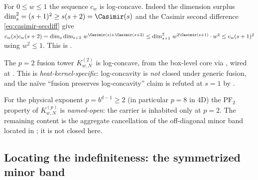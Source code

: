 \begin{proposition}
\label{prop:core-b-coeff-lc}
For $0\le w\le 1$ the sequence $c_w$ is log-concave.  Indeed the dimension surplus
$\dim_s^{2}=(s+1)^{2}\ge s(s+2)=\Casimir(s)$ and the Casimir second difference
\eqref{eq:casimir-secdiff} give
\(
  c_w(s)c_w(s+2) = \dim_s\dim_{s+2}\,w^{\Casimir(s)+\Casimir(s+2)}
    \le \dim_{s+1}^{2}\,w^{2\Casimir(s+1)}\cdot w^{2} \le c_w(s+1)^{2}
\)
using $w^{2}\le 1$.  This is .
\end{proposition}

\begin{proposition}[Fusion preserves PF$_2$ at $p=2$; PROVED, with the honest caveat]
\label{prop:core-b-p2-lc}
The $p=2$ fusion tower $K^{(2)}_{w,N}$ is log-concave, from the box-level core
 via
, wired at
.  This is
\emph{heat-kernel-specific}: log-concavity is \emph{not} closed under generic
\SUtwo{} fusion, and the naïve ``fusion preserves log-concavity'' claim is refuted
at $s=1$ by .
\end{proposition}

\begin{remark}
\label{rem:core-b-gap-lc}
For the physical exponent $p = b^{d-1}\ge 2$ (in particular $p=8$ in $4$D) the
PF$_2$ property of $K^{(p)}_{w,N}$ is \emph{named-open}: the carrier
 is inhabited only at $p=2$.
The remaining content is the aggregate cancellation of the off-diagonal minor band
located in ; it is not closed here.
\end{remark}

\subsection{Locating the indefiniteness: the symmetrized minor band}
\label{sec:core-b-defect}

